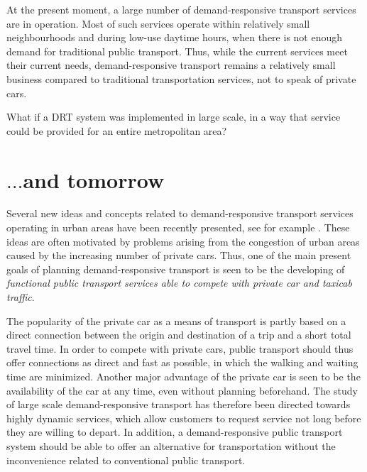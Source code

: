 \documentclass[dissertation,draft*]{aaltoseries}
\begin{document}
At the present moment, a large number of demand-responsive transport services are 
in operation. Most of such services operate within relatively small neighbourhoods and 
during low-use daytime hours, when there is not enough demand for traditional 
public transport. Thus, while the current services meet their current needs,
demand-responsive transport remains a relatively small business
compared to traditional transportation services, not to speak of private cars.

What if a DRT system was implemented in large scale, in a way that service could be provided
for an entire metropolitan area?

\section{$\ldots$and tomorrow}
Several new ideas and concepts related to demand-responsive transport
services operating in urban areas have been recently presented, see for example \cite{cortes,jokinen-fists-2011}.
These ideas are often motivated by problems arising from the congestion of urban 
areas caused by the increasing number of private cars.
Thus, one of the main present goals of planning demand-responsive transport is seen
to be the developing of \emph{functional public transport services able to compete
with private car and taxicab traffic}.


The popularity of the private car as a means of transport is partly based on
a direct connection between the origin and destination of a trip and
a short total travel time. In order to compete with private cars, public transport 
should thus offer connections as direct and fast as possible, in which 
the walking and waiting time are minimized. 
Another major advantage of the private car is seen to be the availability
of the car at any time, even without planning beforehand. The study of large scale 
demand-responsive transport has therefore been directed towards highly dynamic services, which allow 
customers to request service not long before they are willing to depart.
In addition, a demand-responsive public transport system should be
able to offer an alternative for transportation without
the inconvenience related to conventional public transport.

\end{document}
